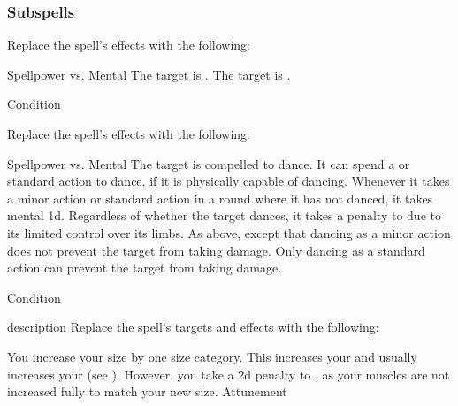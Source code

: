 \subsubsection{Subspells}
Replace the spell's effects with the following:
\begin{spellcontent}
\begin{augmenteffects}
\begin{spellattack}{Spellpower vs. Mental}
\spellsuccess The target is \disoriented.
\spellcritical The target is \confused.
\end{spellattack}
\spelldur Condition
\end{augmenteffects}
\end{spellcontent}
Replace the spell's effects with the following:
\begin{spellcontent}
\begin{augmenteffects}
\begin{spellattack}{Spellpower vs. Mental}
\spellsuccess
The target is compelled to dance.
It can spend a  or standard action to dance, if it is physically capable of dancing.
Whenever it takes a minor action or standard action in a round where it has not danced, it takes mental  \plus1d.
Regardless of whether the target dances, it takes a  penalty to  due to its limited control over its limbs.
\spellcritical
As above, except that dancing as a minor action does not prevent the target from taking damage.
Only dancing as a standard action can prevent the target from taking damage.
\end{spellattack}
\spelldur Condition
\end{augmenteffects}
\end{spellcontent}
description
Replace the spell's targets and effects with the following:
\begin{spellcontent}
\begin{augmenttargetinginfo}
\end{augmenttargetinginfo}
\begin{augmenteffects}
\spelleffect
You increase your size by one size category.
This increases your  and usually increases your  (see ).
However, you take a \minus2d penalty to , as your muscles are not increased fully to match your new size.
\spelldur Attunement
\end{augmenteffects}
\end{spellcontent}
